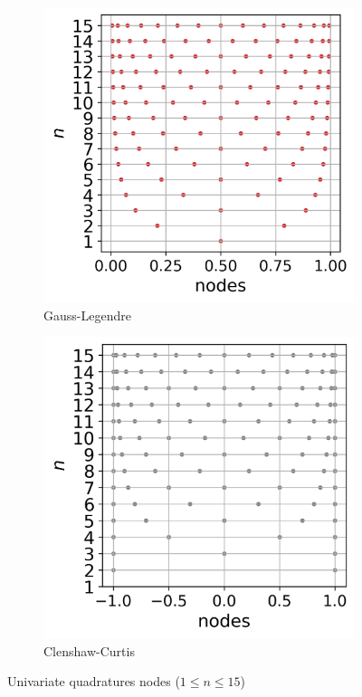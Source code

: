 \begin{figure}[ht]
    \centering
    \begin{subfigure}[b]{0.32\textwidth}
        \centering
        \includegraphics[width=\textwidth]{../numerical_experiments/chapter1/figures/univariate_gauss_legendre.png}
        \caption{Gauss-Legendre}
    \end{subfigure}
    \quad
    \begin{subfigure}[b]{0.32\textwidth}
        \centering
        \includegraphics[width=\textwidth]{../numerical_experiments/chapter1/figures/univariate_clenshaw_curtis.png}
        \caption{Clenshaw-Curtis}
    \end{subfigure}
    \caption{Univariate quadratures nodes ($1 \leq n \leq 15$)}
    \label{fig:univariate_quads}
\end{figure}


